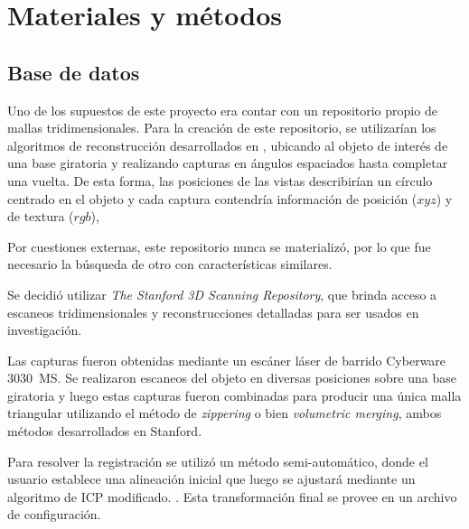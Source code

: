 \chapter{Materiales y métodos}

\section{Base de datos}
Uno de los supuestos de este proyecto era contar con un repositorio propio de
mallas tridimensionales.
Para la creación de este repositorio,
se utilizarían los algoritmos de reconstrucción desarrollados en ,
ubicando al objeto de interés de una base giratoria y realizando capturas
en ángulos espaciados hasta completar una vuelta.
De esta forma, las posiciones de las vistas describirían un círculo centrado en el objeto y
cada captura contendría información de posición ($xyz$) y de textura ($rgb$),

Por cuestiones externas, este repositorio nunca se materializó, por lo que fue necesario
la búsqueda de otro con características similares.


Se decidió utilizar \emph{The Stanford 3D Scanning Repository}, que brinda
acceso a escaneos tridimensionales y reconstrucciones detalladas para ser
usados en investigación.

Las capturas fueron obtenidas mediante un escáner láser de barrido Cyberware
3030~MS.  Se realizaron escaneos del objeto en diversas posiciones sobre una
base giratoria y luego estas capturas fueron combinadas para producir una única
malla triangular utilizando el método de \emph{zippering} o bien
\emph{volumetric merging}, ambos métodos desarrollados en
Stanford.

Para resolver la registración se utilizó un método semi-automático,
donde el usuario establece una alineación inicial que luego se ajustará mediante un algoritmo
de ICP modificado.  .
Esta transformación final se provee en un archivo de configuración.

